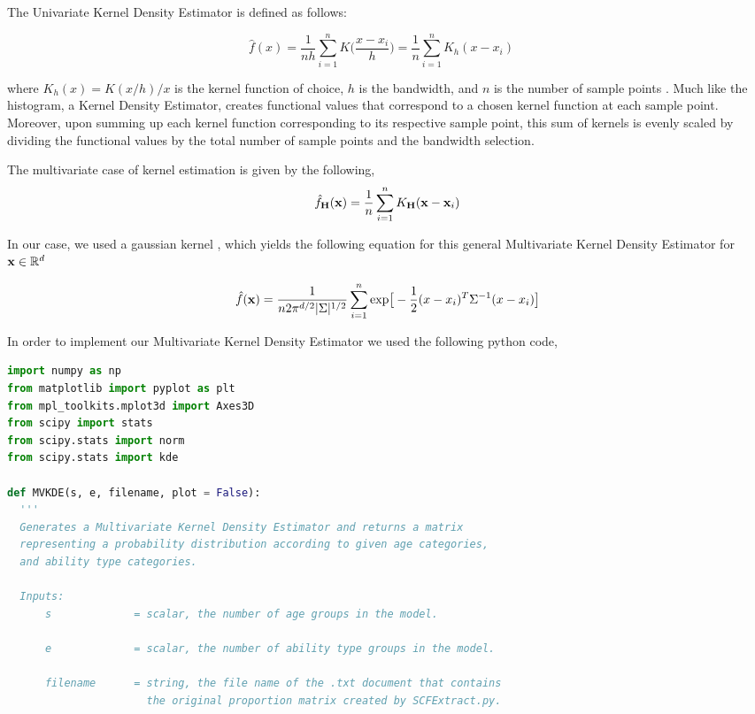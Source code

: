 \documentclass[letterpaper,12pt]{article}
\theoremstyle{definition}
\begin{document}
\begin{spacing}{1.5}
    The Univariate Kernel Density Estimator is defined as follows:

    \[\hat{f}(x) = \frac{1}{nh} \sum_{i=1}^n K\Big(\frac{x-x_i}{h}\Big)= \frac{1}{n}\sum_{i=1}^n K_h (x - x_i) \quad \]

    where $K_h(x) =  K(x/h)/x$ is the kernel function of choice, $h$ is the bandwidth, and $n$ is the number of sample points \citet{Scott:2015}. Much like the histogram, a Kernel Density Estimator, creates functional values that correspond to a chosen kernel function at each sample point. Moreover, upon summing up each kernel function corresponding to its respective sample point, this sum of kernels is evenly scaled by dividing the functional values by the total number of sample points and the bandwidth selection.

    The multivariate case of kernel estimation is given by the following,
    \[\hat{f}_\bold{H}(\bold{x})= \frac1n \sum_{i=1}^n K_\bold{H} (\bold{x} - \bold{x}_i)\]

    In our case, we used a gaussian kernel , which yields the following equation for this general Multivariate Kernel Density Estimator for $\bold{x} \in \mathbb{R}^d$

    \[\hat{f}(\bold{x}) = \frac{1}{n2\pi ^{d/2} |\Sigma|^{1/2}} \sum_{i=1}^n \text{exp}\big[-\frac{1}{2}(x-x_i)^T\Sigma ^{-1}(x-x_i)\big]\]
    \citet{Scott:2005}

    In order to implement our Multivariate Kernel Density Estimator we used the following python code,\\

    \begin{lstlisting}[language=Python, caption=MVKDE.py]
import numpy as np
from matplotlib import pyplot as plt
from mpl_toolkits.mplot3d import Axes3D
from scipy import stats
from scipy.stats import norm
from scipy.stats import kde

def MVKDE(s, e, filename, plot = False):
  '''
  Generates a Multivariate Kernel Density Estimator and returns a matrix
  representing a probability distribution according to given age categories,
  and ability type categories.

  Inputs:
      s             = scalar, the number of age groups in the model.

      e             = scalar, the number of ability type groups in the model.

      filename      = string, the file name of the .txt document that contains 
                      the original proportion matrix created by SCFExtract.py.


\end{lstlisting}
\end{spacing}
\end{document}
